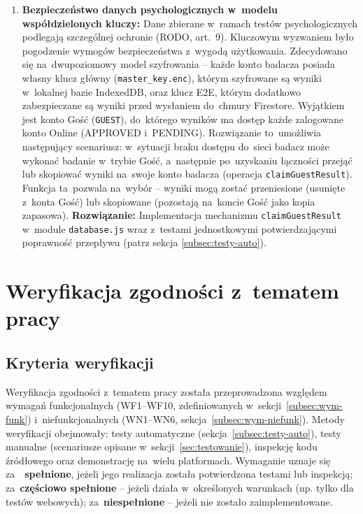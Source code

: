 \documentclass[12pt, a4paper, oneside]{report}
\begin{document}
\begin{enumerate}
	\item \textbf{Bezpieczeństwo danych psychologicznych w~modelu współdzielonych
		      kluczy:}
	      Dane zbierane w~ramach testów psychologicznych podlegają szczególnej ochronie
	      (RODO, art.~9). Kluczowym wyzwaniem było pogodzenie wymogów bezpieczeństwa
	      z~wygodą użytkowania. Zdecydowano się na~dwupoziomowy model szyfrowania --
	      każde konto badacza posiada własny klucz główny (\texttt{master\_key.enc}),
	      którym szyfrowane są wyniki w~lokalnej bazie IndexedDB, oraz klucz E2E,
	      którym dodatkowo zabezpieczane są wyniki przed wysłaniem do~chmury Firestore.
	      Wyjątkiem jest konto Gość (\texttt{GUEST}), do~którego wyników ma dostęp
	      każde zalogowane konto Online (APPROVED i~PENDING). Rozwiązanie to~umożliwia
	      następujący scenariusz: w~sytuacji braku dostępu do~sieci badacz może wykonać
	      badanie w~trybie Gość, a~następnie po~uzyskaniu łączności przejąć lub
	      skopiować wyniki na~swoje konto badacza (operacja
	      \texttt{claimGuestResult}). Funkcja ta~pozwala na~wybór -- wyniki mogą zostać
	      przeniesione (usunięte z~konta Gość) lub skopiowane (pozostają na~koncie
	      Gość jako kopia zapasowa).
	      \textbf{Rozwiązanie:} Implementacja mechanizmu \texttt{claimGuestResult}
	      w~module \texttt{database.js} wraz z~testami jednostkowymi potwierdzającymi
	      poprawność przepływu (patrz sekcja \ref{subsec:testy-auto}).

\end{enumerate}


\chapter{Weryfikacja zgodności z~tematem pracy}
\label{chap:weryfikacja}


\section{Kryteria weryfikacji}
\label{sec:kryteria}

Weryfikacja zgodności z~tematem pracy została przeprowadzona względem wymagań funkcjonalnych (WF1--WF10, zdefiniowanych w~sekcji~\ref{subsec:wym-funk}) i~niefunkcjonalnych (WN1--WN6, sekcja~\ref{subsec:wym-niefunk}). Metody weryfikacji obejmowały: testy automatyczne (sekcja~\ref{subsec:testy-auto}), testy manualne (scenariusze opisane w~sekcji~\ref{sec:testowanie}), inspekcję kodu źródłowego oraz demonstrację na~wielu platformach. Wymaganie uznaje się za~~\textbf{spełnione}, jeżeli jego realizacja została potwierdzona testami lub inspekcją; za~\textbf{częściowo spełnione} -- jeżeli działa w~określonych warunkach (np. tylko dla testów webowych); za~\textbf{niespełnione} -- jeżeli nie zostało zaimplementowane.
\end{document}
